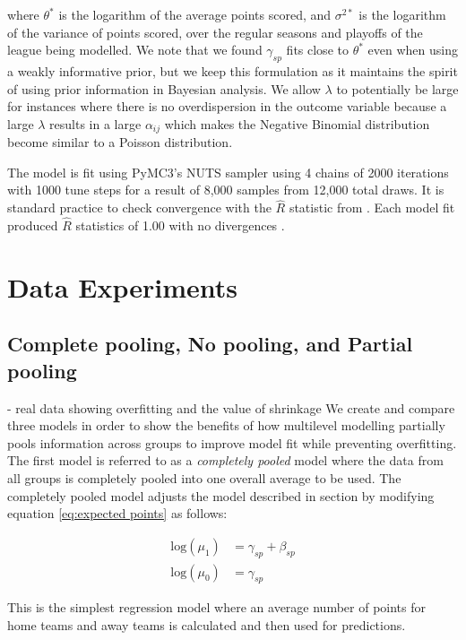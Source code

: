 where \(\theta^*\) is the logarithm of the average points scored, and \(\sigma^{2*}\) is the logarithm of the variance of points scored, over the regular seasons and playoffs of the league being modelled. We note that we found \(\gamma_{sp}\) fits close to \(\theta^*\) even when using a weakly informative prior, but we keep this formulation as it maintains the spirit of using prior information in Bayesian analysis. We allow \(\lambda\) to potentially be large for instances where there is no overdispersion in the outcome variable because a large \(\lambda\) results in a large \(\alpha_{ij}\) which makes the Negative Binomial distribution become similar to a Poisson distribution.

The model is fit using PyMC3's NUTS sampler using 4 chains of 2000 iterations with 1000 tune steps for a result of 8,000 samples from 12,000 total draws. It is standard practice to check convergence with the \(\hat{R}\) statistic from \cite{Gelman1992} \cite{Brooks1997}.  Each model fit produced \(\hat{R}\) statistics of 1.00 with no divergences \cite{Betancourt2017}.

\section{Data Experiments}

\subsection{Complete pooling, No pooling, and Partial pooling}
- real data showing overfitting and the value of shrinkage
We create and compare three models in order to show the benefits of how multilevel modelling partially pools information across groups to improve model fit while preventing overfitting. The first model is referred to as a \textit{completely pooled} model where the data from all groups is completely pooled into one overall average to be used. The completely pooled model adjusts the model described in section  by modifying equation \ref{eq:expected points} as follows:

\begin{equation} \label{eq:cp_model}
\begin{split}
\text{log}(\mu_{1}) &= \gamma_{sp} + \beta_{sp} \\
\text{log}(\mu_{0}) &= \gamma_{sp}
\end{split}
\end{equation}

This is the simplest regression model where an average number of points for home teams and away teams is calculated and then used for predictions.

